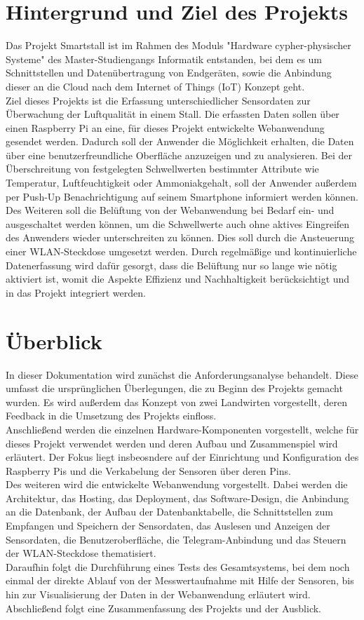 \documentclass[conference]{IEEEtran}
\begin{document}
\section{Hintergrund und Ziel des Projekts}
Das Projekt Smartstall ist im Rahmen des Moduls "Hardware cypher-physischer Systeme" des Master-Studiengangs Informatik entstanden, bei dem es um Schnittstellen und Datenübertragung von Endgeräten, sowie die Anbindung dieser an die Cloud nach dem Internet of Things (IoT) Konzept geht. \\
Ziel dieses Projekts ist die Erfassung unterschiedlicher Sensordaten zur Überwachung der Luftqualität in einem Stall. Die erfassten Daten sollen über einen Raspberry Pi an eine, für dieses Projekt entwickelte Webanwendung gesendet werden. Dadurch soll der Anwender die Möglichkeit erhalten, die Daten über eine benutzerfreundliche Oberfläche anzuzeigen und zu analysieren. Bei der Überschreitung von festgelegten Schwellwerten bestimmter Attribute wie Temperatur, Luftfeuchtigkeit oder Ammoniakgehalt, soll der Anwender außerdem per Push-Up Benachrichtigung auf seinem Smartphone informiert werden können. \\
Des Weiteren soll die Belüftung von der Webanwendung bei Bedarf ein- und ausgeschaltet werden können, um die Schwellwerte auch ohne aktives Eingreifen des Anwenders wieder unterschreiten zu können. Dies soll durch die Ansteuerung einer WLAN-Steckdose umgesetzt werden. Durch regelmäßige und kontinuierliche Datenerfassung wird dafür gesorgt, dass die Belüftung nur so lange wie nötig aktiviert ist, womit die Aspekte Effizienz und Nachhaltigkeit berücksichtigt und in das Projekt integriert werden. 

\section{Überblick}
In dieser Dokumentation wird zunächst die Anforderungsanalyse behandelt. Diese umfasst die ursprünglichen Überlegungen, die zu Beginn des Projekts gemacht wurden. Es wird außerdem das Konzept von zwei Landwirten vorgestellt, deren Feedback in die Umsetzung des Projekts einfloss. \\
Anschließend werden die einzelnen Hardware-Komponenten vorgestellt, welche für dieses Projekt verwendet werden und deren Aufbau und Zusammenspiel wird erläutert. Der Fokus liegt insbeosndere auf der Einrichtung und Konfiguration des Raspberry Pis und die Verkabelung der Sensoren über deren Pins. \\
Des weiteren wird die entwickelte Webanwendung vorgestellt. Dabei werden die Architektur, das Hosting, das Deployment, das Software-Design, die Anbindung an die Datenbank, der Aufbau der Datenbanktabelle, die Schnittstellen zum Empfangen und Speichern der Sensordaten, das Auslesen und Anzeigen der Sensordaten, die Benutzeroberfläche, die Telegram-Anbindung und das Steuern der WLAN-Steckdose thematisiert. \\
Daraufhin folgt die Durchführung eines Tests des Gesamtsystems, bei dem noch einmal der direkte Ablauf von der Messwertaufnahme mit Hilfe der Sensoren, bis hin zur Visualisierung der Daten in der Webanwendung erläutert wird. Abschließend folgt eine Zusammenfassung des Projekts und der Ausblick. 
\end{document}
